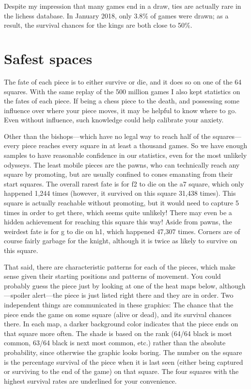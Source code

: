 \documentclass[twocolumn]{article}
\begin{document}
Despite my impression that many games end in a draw, ties are actually
rare in the lichess database. In January 2018, only 3.8\% of games
were drawn;
as a result, the survival chances for the kings are both close to
50\%.

\section{Safest spaces}

The fate of each piece is to either survive or die, and it does so on
one of the 64 squares. With the same replay of the 500 million games
I also kept statistics on the fates of each piece. If being a chess
piece to the death, and possessing some influence over where your piece
moves, it may be helpful to know where to go. Even without influence,
such knowledge could help calibrate your anxiety.

Other than the bishops---which have no legal way to reach half of the
squares---every piece reaches every square in at least a thousand
games. So we have enough samples to have reasonable confidence in our
statistics, even for the most unlikely odysseys. The least mobile
pieces are the pawns, who can technically reach any square by
promoting, but are usually confined to cones emanating from their
start squares. The overall rarest fate is for \pawn f2 to die on the
a7 square, which only happened 1,244 times (however, it survived on
this square 31,438 times). This square is actually reachable without
promoting, but it would need to capture 5 times in order to get
there, which seems quite unlikely! There may even be a hidden
achievement for reaching this square this way!
Aside from pawns, the weirdest fate is for \knight g to die on h1,
which happened 47,307 times. Corners are of course fairly garbage for
the knight, although it is twice as likely to survive on this square.


That said, there are characteristic patterns for each of the pieces,
which make sense given their starting positions and patterns of
movement. You could probably guess the piece just by looking at one of
the heat maps below, although---spoiler alert---the piece is just
listed right there and they are in order. Two independent things are
communicated in these graphics: The chance that the piece ends the
game on some square (alive or dead), and its survival chances there.
In each map, a darker background color indicates that the piece ends
on that square more often. The shade is based on the rank (64/64 black
is most common, 63/64 black is next most common, etc.) rather than the
absolute probability, since otherwise the graphic looks boring. The
number on the square is the percentage survival of the piece when it
is last seen (either being captured or surviving to the end of the
game) on that square. The four squares with the highest survival rates
are underlined for your convenience.
\end{document}
